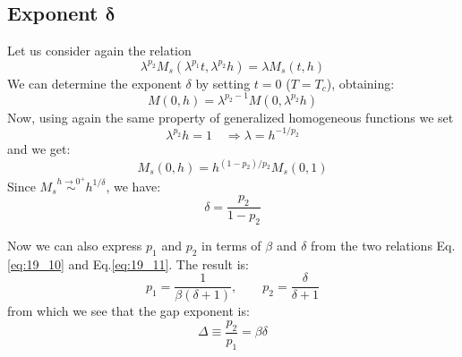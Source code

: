 \documentclass[../main/main.tex]{subfiles}
\begin{document}
\subsection{Exponent \( \pmb{\delta}  \)}
Let us consider again the relation
\begin{equation*}
   \lambda ^{p_2} M_s ( \lambda ^{p_1} t, \lambda ^{p_2} h) = \lambda M_s (t,h)
\end{equation*}
We can determine the exponent \( \delta  \) by setting \( t=0 \) (\( T=T_c  \)), obtaining:
\begin{equation*}
  M(0,h) = \lambda ^{p_2-1} M (0, \lambda ^{p_2} h)
\end{equation*}
Now, using again the same property of generalized homogeneous functions we set
\begin{equation*}
  \lambda ^{p_2} h = 1 \quad \Rightarrow \lambda = h^{-1/p_2}
\end{equation*}
and we get:
\begin{equation*}
  M_s (0,h) =  h^{(1-p_2)/p_2} M_s (0,1)
\end{equation*}
Since \(  M_s  \overset{h \rightarrow 0^+}{\sim} h^{1/\delta } \), we have:
\begin{equation}
  \delta = \frac{p_2}{ 1 - p_2 }
  \label{eq:19_11}
\end{equation}

Now we can also express \( p_1 \) and \( p_2 \)  in terms of \( \beta  \) and \( \delta  \) from the two relations Eq.\eqref{eq:19_10} and Eq.\eqref{eq:19_11}. The result is:
\begin{equation}
  p_1 = \frac{1}{\beta (\delta +1)}, \qquad p_2 = \frac{\delta }{\delta + 1}
\end{equation}
from which we see that the gap exponent is:
\begin{equation}
  \Delta \equiv \frac{p_2}{p_1}  = \beta \delta
\end{equation}
\end{document}
